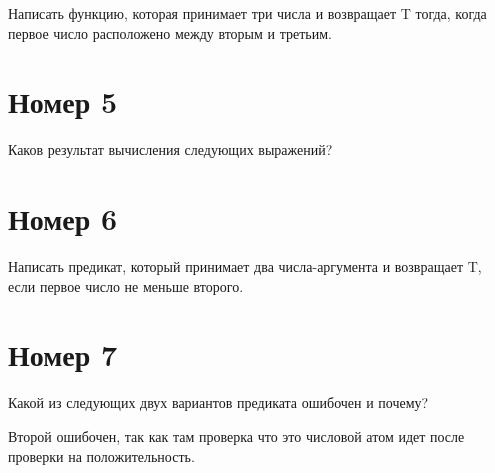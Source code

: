 Написать функцию, которая принимает три числа и возвращает T
тогда, когда первое число расположено между вторым и третьим.

\begin{figure}[H]
    \begin{listingbox}{}
        
    \end{listingbox}
    \label{lst:4}
\end{figure}

\section{Номер 5}

Каков результат вычисления следующих выражений?

\begin{figure}[H]
    \begin{listingbox}{}
        
    \end{listingbox}
    \label{lst:5}
\end{figure}

\section{Номер 6}

Написать предикат, который принимает два числа-аргумента 
и возвращает T, если первое число не меньше второго.

\begin{figure}[H]
    \begin{listingbox}{}
        
    \end{listingbox}
    \label{lst:6}
\end{figure}

\section{Номер 7}

Какой из следующих двух вариантов предиката ошибочен и почему?

\begin{figure}[H]
    \begin{listingbox}{}
        
    \end{listingbox}
    \label{lst:7}
\end{figure}

Второй ошибочен, так как там проверка что это числовой атом идет после
проверки на положительность.

